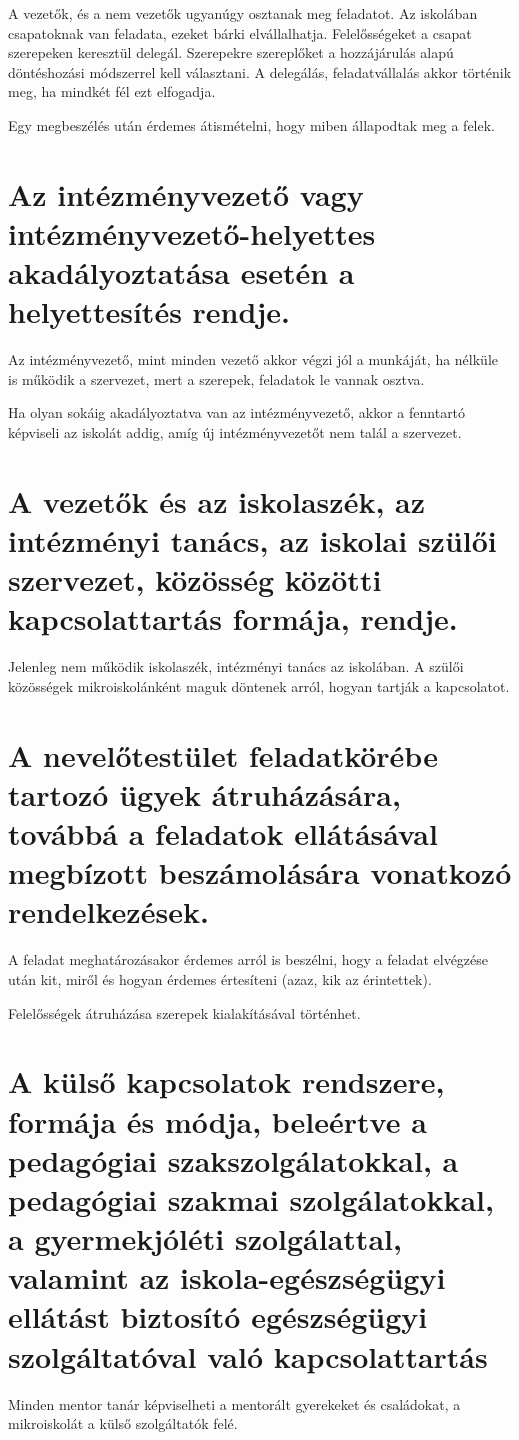 A vezetők, és a nem vezetők ugyanúgy osztanak meg feladatot. Az iskolában csapatoknak van feladata, ezeket bárki elvállalhatja. Felelősségeket a csapat szerepeken keresztül delegál. Szerepekre szereplőket a hozzájárulás alapú döntéshozási módszerrel kell választani. A delegálás, feladatvállalás akkor történik meg, ha mindkét fél ezt elfogadja.

Egy megbeszélés után érdemes átismételni, hogy miben állapodtak meg a felek.


\section{Az intézményvezető vagy intézményvezető-helyettes akadályoztatása esetén a helyettesítés rendje.}
Az intézményvezető, mint minden vezető akkor végzi jól a munkáját, ha nélküle is működik a szervezet, mert a szerepek, feladatok le vannak osztva.

Ha olyan sokáig akadályoztatva van az intézményvezető, akkor a fenntartó képviseli az iskolát addig, amíg új intézményvezetőt nem talál a szervezet.

\section{A vezetők és az iskolaszék, az intézményi tanács, az iskolai szülői szervezet, közösség közötti kapcsolattartás formája, rendje.}
Jelenleg nem működik iskolaszék, intézményi tanács az iskolában. A szülői közösségek mikroiskolánként maguk döntenek arról, hogyan tartják a kapcsolatot.


\section{A nevelőtestület feladatkörébe tartozó ügyek átruházására, továbbá a feladatok ellátásával megbízott beszámolására vonatkozó rendelkezések.}
A feladat meghatározásakor érdemes arról is beszélni, hogy a feladat elvégzése után kit, miről és hogyan érdemes értesíteni (azaz, kik az érintettek).

Felelősségek átruházása szerepek kialakításával történhet. 

\section{A külső kapcsolatok rendszere, formája és módja, beleértve a pedagógiai szakszolgálatokkal, a pedagógiai szakmai szolgálatokkal, a gyermekjóléti szolgálattal, valamint az iskola-egészségügyi ellátást biztosító egészségügyi szolgáltatóval való kapcsolattartás}
Minden mentor tanár képviselheti a mentorált gyerekeket és családokat, a mikroiskolát a külső szolgáltatók felé.

